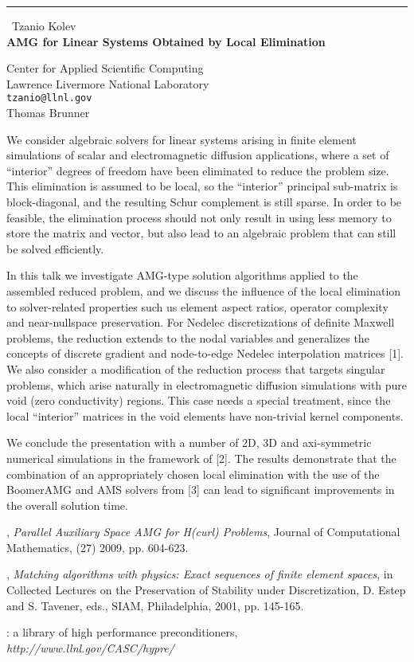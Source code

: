 \documentclass{report}
\begin{document}
\begin{center}
\rule{6in}{1pt} \
{\large Tzanio Kolev \\
{\bf AMG for Linear Systems Obtained by Local Elimination}}

Center for Applied Scientific Computing \\ Lawrence Livermore National Laboratory
\\
{\tt tzanio@llnl.gov}\\
Thomas Brunner\end{center}

We consider algebraic solvers for linear systems arising in finite
element simulations of scalar and electromagnetic diffusion applications,
where a set of ``interior'' degrees of freedom have been eliminated to
reduce the problem size. This elimination is assumed to be local, so the
``interior'' principal sub-matrix is block-diagonal, and the resulting
Schur complement is still sparse. In order to be feasible, the
elimination process should not only result in using less memory to store
the matrix and vector, but also lead to an algebraic problem that can
still be solved efficiently.

In this talk we investigate AMG-type solution algorithms applied to the
assembled reduced problem, and we discuss the influence of the local
elimination to solver-related properties such us element aspect ratios,
operator complexity and near-nullspace preservation. For Nedelec
discretizations of definite Maxwell problems, the reduction extends to
the nodal variables and generalizes the concepts of discrete gradient and
node-to-edge Nedelec interpolation matrices [1]. We also consider a
modification of the reduction process that targets singular problems,
which arise naturally in electromagnetic diffusion simulations with pure
void (zero conductivity) regions. This case needs a special treatment,
since the local ``interior'' matrices in the void elements have
non-trivial kernel components.

We conclude the presentation with a number of 2D, 3D and axi-symmetric
numerical simulations in the framework of [2]. The results demonstrate
that the combination of an appropriately chosen local elimination with
the use of the BoomerAMG and AMS solvers from [3] can lead to significant
improvements in the overall solution time.

\bigskip


,
{\it Parallel Auxiliary Space AMG for H(curl) Problems}, Journal of
Computational Mathematics, (27) 2009, pp. 604-623.

\smallskip

,
{\it Matching algorithms with physics: Exact sequences of finite element spaces}, in
Collected Lectures on the Preservation of Stability under Discretization,
D. Estep and S. Tavener, eds., SIAM, Philadelphia, 2001, pp. 145-165.

\smallskip

: a library of high performance preconditioners, {\it
http://www.llnl.gov/CASC/hypre/}
\end{document}
